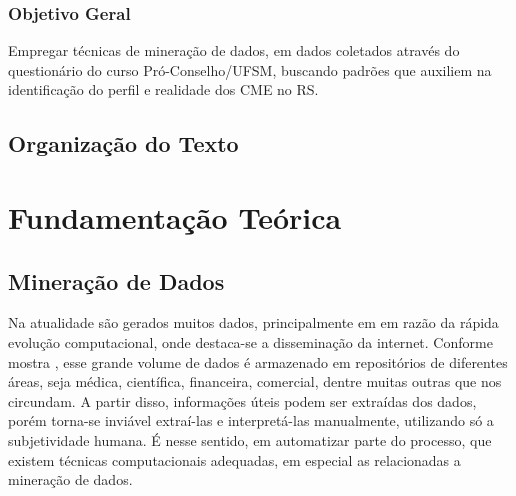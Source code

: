 \documentclass[tg]{mdtufsm}
\begin{document}
\subsection{Objetivo Geral}

Empregar técnicas de mineração de dados, em dados coletados através do questionário do curso Pró-Conselho/UFSM, buscando padrões que auxiliem na identificação do perfil e realidade dos CME no RS.

\begin{comment}
\section{Objetivos Específicos}
\begin{itemize}
  \item Construir um banco de dados relacional e populá-lo;
  \item Desenvolver um sistema {\it web} para a coleta e visualização dos dados.
  \item Pesquisar sobre as técnicas de mineração de dados;
  \item Estudar formas de pré-processar o \textit{data set} obtido;
  \item Identificar e aplicar uma técnica de mineração de dados que melhor se enquadre sobre os dados resultantes do pré-processamento;
  \item Encontrar padrões que auxiliem na identificação do perfil dos conselhos municipais de educação no RS.
\end{itemize}
\end{comment}

\section{Organização do Texto}



\chapter{Fundamentação Teórica}

\section{Mineração de Dados}

Na atualidade são gerados muitos dados, principalmente em em razão da rápida evolução computacional, onde destaca-se a disseminação da internet. Conforme mostra \cite{enia5}, esse grande volume de dados é armazenado em repositórios de diferentes áreas, seja médica, científica, financeira, comercial, dentre muitas outras que nos circundam. A partir disso, informações úteis podem ser extraídas dos dados, porém torna-se inviável extraí-las e interpretá-las manualmente, utilizando só a subjetividade humana. É nesse sentido, em automatizar parte do processo, que existem técnicas computacionais adequadas, em especial as relacionadas a mineração de dados.
\end{document}
